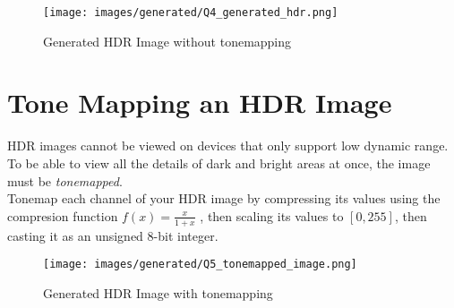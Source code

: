 \documentclass{article}
\begin{document}
\begin{figure}[h]
    \texttt{[image: images/generated/Q4\_generated\_hdr.png]}
    \caption{Generated HDR Image without tonemapping}
\end{figure}

\newpage

\section{Tone Mapping an HDR Image}
HDR images cannot be viewed on devices that only support low dynamic range. To be able to view all the details of dark and bright areas at once, the image must be \emph{tonemapped}. \\

\noindent
Tonemap each channel of your HDR image by compressing its values using the compresion function $f(x)=\frac{x}{1+x}$ , then scaling its values to $[0,255]$, then casting it as an unsigned 8-bit integer. 
\begin{figure}[h]
    \texttt{[image: images/generated/Q5\_tonemapped\_image.png]}
    \caption{Generated HDR Image with tonemapping}
\end{figure}
\end{document}
